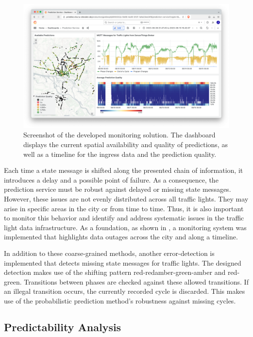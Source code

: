 \begin{figure}[t]
\centering
\includegraphics[width=\linewidth]{images/monitoring-screenshot.png}
\caption{Screenshot of the developed monitoring solution. The dashboard displays the current spatial availability and quality of predictions, as well as a timeline for the ingress data and the prediction quality.}
\label{fig:monitoring-screenshot}
\end{figure}

Each time a state message is shifted along the presented chain of information, it introduces a delay and a possible point of failure. As a consequence, the prediction service must be robust against delayed or missing state messages. However, these issues are not evenly distributed across all traffic lights. They may arise in specific areas in the city or from time to time. Thus, it is also important to monitor this behavior and identify and address systematic issues in the traffic light data infrastructure. As a foundation, as shown in , a monitoring system was implemented that highlights data outages across the city and along a timeline.

In addition to these coarse-grained methods, another error-detection is implemented that detects missing state messages for traffic lights. The designed detection makes use of the shifting pattern red-redamber-green-amber and red-green. Transitions between phases are checked against these allowed transitions. If an illegal transition occurs, the currently recorded cycle is discarded. This makes use of the probabilistic prediction method's robustness against missing cycles.

\subsection{Predictability Analysis}

